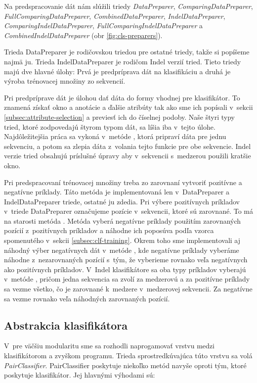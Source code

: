 Na predspracovanie dát nám slúžili triedy \textit{DataPreparer}, \textit{ComparingDataPreparer}, \textit{FullComparingDataPreparer}, \textit{CombinedDataPreparer},
\textit{IndelDataPreparer}, \textit{ComparingIndelDataPreparer}, \textit{FullComparingIndelDataPreparer} a \textit{CombinedIndelDataPreparer} (obr \ref{fig:cls-preparers}).

Trieda DataPreparer je rodičovskou triedou pre ostatné triedy, takže si popíšeme najmä ju. Trieda IndelDataPreparer je rodičom Indel verzií tried. Tieto triedy majú dve hlavné úlohy: Prvá je predpríprava dát na klasifikáciu a druhá je výroba trénovacej množiny zo sekvencií.

Pri predpríprave dát je úlohou dať dáta do formy vhodnej pre klasifikátor. To znamená získať okno a anotácie a ďalšie atribúty tak ako sme ich popísali v~sekcii \ref{subsec:attribute-selection} a previesť ich do číselnej podoby. Naše štyri typy tried, ktoré zodpovedajú štyrom typom dát, sa líšia iba v~tejto úlohe. Najdôležitejšia práca sa vykoná v~metóde , ktorá pripraví dáta pre jednu sekvenciu, a potom sa zlepia dáta z~volania tejto funkcie pre obe sekvencie. Indel verzie tried obsahujú príslušné úpravy aby v~sekvencii s~medzerou použili kratšie okno.

Pri predspracovaní trénovacej množiny treba zo zarovnaní vytvoriť pozitívne a negatívne príklady. Táto metóda je implementovaná len v~DataPreparer a IndelDataPreparer triede, ostatné ju zdedia. Pri výbere pozitívnych príkladov v~triede DataPreparer označujeme pozície v~sekvencii, ktoré sú zarovnané. To má na starosti metóda . Metóda  vyberá negatívne príklady použitím zarovnaných pozícií z~pozitívnych príkladov a náhodne ich poposúva podľa vzorca spomenutého v~sekcii \ref{subsec:clf-training}. Okrem toho sme implementovali aj náhodný výber negatívnych dát v~metóde , kde negatívne príklady vyberáme náhodne z~nezarovnaných pozícií s~tým, že vyberieme rovnako veľa negatívnych ako pozitívnych príkladov. V~Indel klasifikátore sa oba typy príkladov vyberajú v~metóde , pričom jedna sekvencia sa zvolí za medzerovú a za pozitívne príklady sa vezme všetko, čo je zarovnané k~medzere v~medzerovej sekvencii. Za negatívne sa vezme rovnako veľa náhodných zarovnaných pozícií.

\subsection{Abstrakcia klasifikátora}
\label{subsec:pairclassifier}
V~pre väčšiu modularitu sme sa rozhodli naprogamovať vrstvu medzi klasifikátorom a zvyškom programu. Trieda sprostredkúvajúca túto vrstvu sa volá \textit{PairClassifier}. PairClassifier poskytuje niekoľko metód navyše oproti tým, ktoré poskytuje klasifikátor.
Jej hlavnými výhodami sú:

